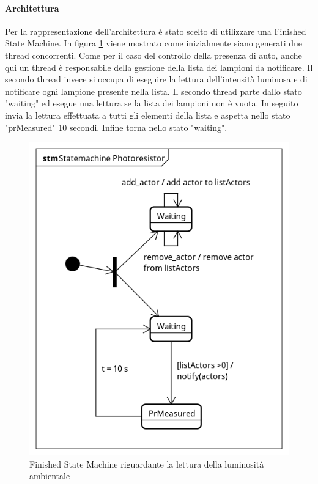 \paragraph{Architettura}
Per la rappresentazione dell'architettura è stato scelto di utilizzare una Finished State Machine.
In figura \ref{FSM PR} viene mostrato come inizialmente siano generati due thread concorrenti. Come per il caso del controllo della presenza di auto, anche qui un thread è responsabile della gestione della lista dei lampioni da notificare. Il secondo thread invece si occupa di eseguire la lettura dell'intensità luminosa e di notificare ogni lampione presente nella lista.
Il secondo thread parte dallo stato "waiting" ed esegue una lettura se la lista dei lampioni non è vuota. In seguito invia la lettura effettuata a tutti gli elementi della lista e aspetta nello stato "prMeasured" 10 secondi. Infine torna nello stato "waiting".
\begin{figure}[tbp]
	\centering
	\includegraphics[scale=.8]{figure/Statemachine_Photoresistor.png}
	\caption{Finished State Machine riguardante la lettura della luminosità ambientale \label{FSM PR}}
\end{figure}
\newpage

